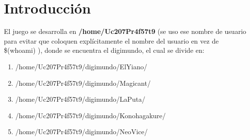 \documentclass[a4paper,10pt]{article}
\begin{document}
\newpage

\setlength\parindent{24pt}
\clearpage

\section{Introducci\'on}
	\hspace{1cm} El juego se desarrolla en \textbf{/home/Uc207Pr4f57t9} (se uso ese nombre de usuario para evitar que coloquen expl\'icitamente el nombre del usuario en vez de \$(whoami) ), donde se encuentra el digimundo, el cual se divide en:
	\begin{enumerate}
		\item /home/Uc207Pr4f57t9/digimundo/ElYiano/
		\item /home/Uc207Pr4f57t9/digimundo/Magicant/
		\item /home/Uc207Pr4f57t9/digimundo/LaPuta/
		\item /home/Uc207Pr4f57t9/digimundo/Konohagakure/
		\item /home/Uc207Pr4f57t9/digimundo/NeoVice/
	\end{enumerate}
	
\end{document}
